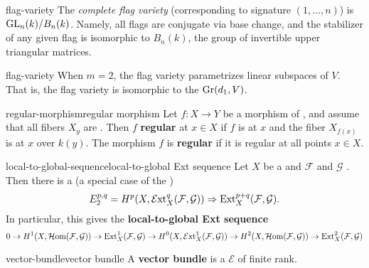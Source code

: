 \begin{example}{flag-variety}
    The \textit{complete flag variety} (corresponding to signature $(1, \ldots, n)$) is $\textup{GL}_n(k) / B_n(k)$. Namely, all flags are conjugate via base change, and the stabilizer of any given flag is isomorphic to $B_n(k)$, the group of invertible upper triangular matrices.
\end{example}

\begin{example}{flag-variety}
    When $m = 2$, the flag variety parametrizes linear subspaces of $V$. That is, the flag variety is isomorphic to the  $\textup{Gr}(d_1, V)$.
\end{example}

\begin{topic}{regular-morphism}{regular morphism}
    Let $f : X \to Y$ be a morphism of , and assume that all fibers $X_y$ are . Then $f$ \textbf{regular} at $x \in X$ if $f$ is  at $x$ and the fiber $X_{f(x)}$ is  at $x$ over $k(y)$. The morphism $f$ is \textbf{regular} if it is regular at all points $x \in X$.
\end{topic}

\begin{topic}{local-to-global-sequence}{local-to-global Ext sequence}
    Let $X$ be a  and $\mathcal{F}$ and $\mathcal{G}$ . Then there is a  (a special case of the )
    \[ E_2^{p, q} = H^p(X, \mathcal{E}\textup{xt}_X^q(\mathcal{F}, \mathcal{G})) \Rightarrow \textup{Ext}_X^{p + q}(\mathcal{F}, \mathcal{G}) . \]
    In particular, this gives the \textbf{local-to-global Ext sequence}
    \[ 0 \to H^1(X, \mathcal{H}\textup{om}(\mathcal{F}, \mathcal{G})) \to \textup{Ext}_X^1(\mathcal{F}, \mathcal{G}) \to H^0(X, \mathcal{E}\textup{xt}_X^1(\mathcal{F}, \mathcal{G})) \to H^2(X, \mathcal{H}\textup{om}(\mathcal{F}, \mathcal{G})) \to \textup{Ext}_X^2(\mathcal{F}, \mathcal{G}) \]
\end{topic}

\begin{topic}{vector-bundle}{vector bundle}
    A \textbf{vector bundle} is a  $\mathcal{E}$ of finite rank.
\end{topic}

